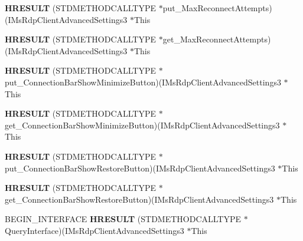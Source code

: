 \begin{DoxyCompactItemize}
{\bfseries H\+R\+E\+S\+U\+LT} (S\+T\+D\+M\+E\+T\+H\+O\+D\+C\+A\+L\+L\+T\+Y\+PE $\ast$put\+\_\+\+Max\+Reconnect\+Attempts)(I\+Ms\+Rdp\+Client\+Advanced\+Settings3 $\ast$This
\item 
\mbox{\label{struct_i_ms_rdp_client_advanced_settings3_vtbl_af394a6e2570da54c620a3c92687615e2}} 
{\bfseries H\+R\+E\+S\+U\+LT} (S\+T\+D\+M\+E\+T\+H\+O\+D\+C\+A\+L\+L\+T\+Y\+PE $\ast$get\+\_\+\+Max\+Reconnect\+Attempts)(I\+Ms\+Rdp\+Client\+Advanced\+Settings3 $\ast$This
\item 
\mbox{\label{struct_i_ms_rdp_client_advanced_settings3_vtbl_a37466ad445c3b910f4deda3d12eb7af1}} 
{\bfseries H\+R\+E\+S\+U\+LT} (S\+T\+D\+M\+E\+T\+H\+O\+D\+C\+A\+L\+L\+T\+Y\+PE $\ast$put\+\_\+\+Connection\+Bar\+Show\+Minimize\+Button)(I\+Ms\+Rdp\+Client\+Advanced\+Settings3 $\ast$This
\item 
\mbox{\label{struct_i_ms_rdp_client_advanced_settings3_vtbl_ac48f96ee6e04ab2b1742db7e08918844}} 
{\bfseries H\+R\+E\+S\+U\+LT} (S\+T\+D\+M\+E\+T\+H\+O\+D\+C\+A\+L\+L\+T\+Y\+PE $\ast$get\+\_\+\+Connection\+Bar\+Show\+Minimize\+Button)(I\+Ms\+Rdp\+Client\+Advanced\+Settings3 $\ast$This
\item 
\mbox{\label{struct_i_ms_rdp_client_advanced_settings3_vtbl_a7b19ac736afe07528f86a78b442e7e1b}} 
{\bfseries H\+R\+E\+S\+U\+LT} (S\+T\+D\+M\+E\+T\+H\+O\+D\+C\+A\+L\+L\+T\+Y\+PE $\ast$put\+\_\+\+Connection\+Bar\+Show\+Restore\+Button)(I\+Ms\+Rdp\+Client\+Advanced\+Settings3 $\ast$This
\item 
\mbox{\label{struct_i_ms_rdp_client_advanced_settings3_vtbl_a786b685cf8cb44f79349ac8d7de314bb}} 
{\bfseries H\+R\+E\+S\+U\+LT} (S\+T\+D\+M\+E\+T\+H\+O\+D\+C\+A\+L\+L\+T\+Y\+PE $\ast$get\+\_\+\+Connection\+Bar\+Show\+Restore\+Button)(I\+Ms\+Rdp\+Client\+Advanced\+Settings3 $\ast$This
\item 
\mbox{\label{struct_i_ms_rdp_client_advanced_settings3_vtbl_a8f6d5e75d19efe4f0e09aeab838e5f19}} 
B\+E\+G\+I\+N\+\_\+\+I\+N\+T\+E\+R\+F\+A\+CE {\bfseries H\+R\+E\+S\+U\+LT} (S\+T\+D\+M\+E\+T\+H\+O\+D\+C\+A\+L\+L\+T\+Y\+PE $\ast$Query\+Interface)(I\+Ms\+Rdp\+Client\+Advanced\+Settings3 $\ast$This

\end{DoxyCompactItemize}
